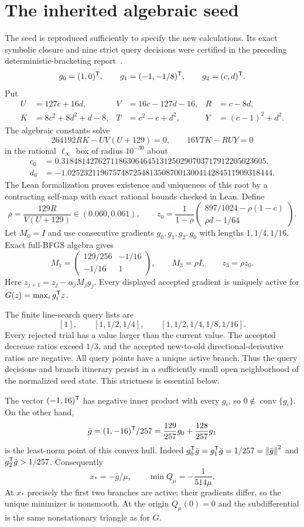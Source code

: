 \section{The inherited algebraic seed}
The seed is reproduced sufficiently to specify the new calculations. Its exact symbolic closure and nine strict query decisions were certified in the preceding deterministic-bracketing report~\cite{SD}.
\[
 g_0=(1,0)^{\mathsf T},\qquad g_1=(-1,-1/8)^{\mathsf T},\qquad g_2=(c,d)^{\mathsf T}.
\]
Put
\begin{align*}
 U&=127c+16d,&V&=16c-127d-16,&R&=c-8d,\\
 K&=8c^2+8d^2+d-8,&T&=c^2-c+d^2,&Y&=(c-1)^2+d^2.
\end{align*}
The algebraic constants solve
\[
 264192RK-UV(U+129)=0,\qquad 16VTK-RUY=0
\]
in the rational $\ell_\infty$ box of radius $10^{-30}$ about
\begin{align*}
 c_0&=0.31848142762711863064645131250290703717912205023605,\\
 d_0&=-1.02523211967574872548135087001300414284511909318444.
\end{align*}
The Lean formalization proves existence and uniqueness of this root by a contracting self-map with exact rational bounds checked in Lean. Define
\[
 \rho=\frac{129R}{V(U+129)}\in(0.060,0.061),\qquad
 z_0=\frac1{1-\rho}
 \begin{pmatrix}897/1024-\rho(1-c)\\ \rho d-1/64\end{pmatrix}.
\]
Let $M_0=I$ and use consecutive gradients $g_0,g_1,g_2,g_0$ with lengths $1,1/4,1/16$. Exact full-BFGS algebra gives
\[
 M_1=\begin{pmatrix}129/256&-1/16\\-1/16&1\end{pmatrix},
 \qquad M_3=\rho I,\qquad z_3=\rho z_0.
\]
Here $z_{j+1}=z_j-\alpha_jM_jg_j$. Every displayed accepted gradient is uniquely active for $G(z)=\max_i g_i^{\mathsf T} z$.

The finite line-search query lists are
\[
 [1],\qquad[1,1/2,1/4],\qquad[1,1/2,1/4,1/8,1/16].
\]
Every rejected trial has a value larger than the current value. The accepted decrease ratios exceed $1/3$, and the accepted new-to-old directional-derivative ratios are negative. All query points have a unique active branch. Thus the query decisions and branch itinerary persist in a sufficiently small open neighborhood of the normalized seed state. This strictness is essential below.

The vector $(-1,16)^{\mathsf T}$ has negative inner product with every $g_i$, so $0\notin\operatorname{conv}\{g_i\}$. On the other hand,
\[
 \bar g=(1,-16)^{\mathsf T}/257
 =\frac{129}{257}g_0+\frac{128}{257}g_1
\]
is the least-norm point of this convex hull. Indeed $g_0^{\mathsf T}\bar g=g_1^{\mathsf T}\bar g=1/257=\left\lVert\bar g\right\rVert^2$ and $g_2^{\mathsf T}\bar g>1/257$. Consequently
\begin{equation}\label{L:eq:minimizer}
 x_*=-\bar g/\mu,\qquad \min Q_\mu=-\frac1{514\mu}.
\end{equation}
At $x_*$ precisely the first two branches are active; their gradients differ, so the unique minimizer is nonsmooth. At the origin $Q_\mu(0)=0$ and the subdifferential is the same nonstationary triangle as for $G$.


